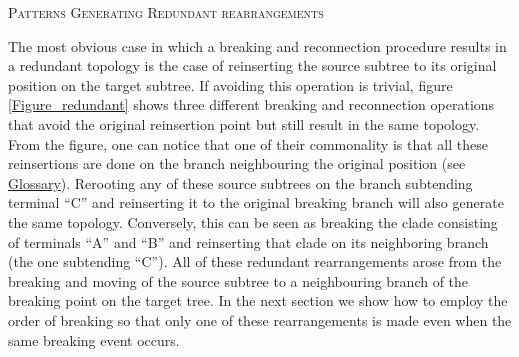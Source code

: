 \documentclass[12pt,letterpaper]{article}
\renewcommand{\section}[1]{%
\bigskip
\begin{center}
\begin{Large}
\normalfont\scshape #1
\medskip
\end{Large}
\end{center}}
\begin{document}
\section{Patterns Generating Redundant rearrangements}
The most obvious case in which a breaking and reconnection procedure results in a redundant topology is the case of reinserting the source subtree to its original position on the target subtree.
If avoiding this operation is trivial, figure \ref{Figure_redundant} shows three different breaking and reconnection operations that avoid the original reinsertion point but still result in the same topology. 
From the figure, one can notice that one of their commonality is that all these reinsertions are done on the branch neighbouring the original position (see \hyperref[Glossary]{Glossary}).
Rerooting any of these source subtrees on the branch subtending terminal ``C'' and reinserting it to the original breaking branch will also generate the same topology.
Conversely, this can be seen as breaking the clade consisting of terminals ``A'' and ``B'' and reinserting that clade on its neighboring branch (the one subtending ``C'').
All of these redundant rearrangements arose from the breaking and moving of the source subtree to a neighbouring branch of the breaking point on the target tree.
In the next section we show how to employ the order of breaking so that only one of these rearrangements is made even when the same breaking event occurs.
\end{document}
